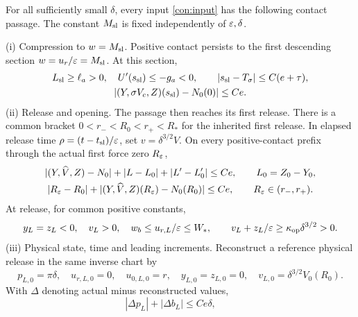 \begin{theorem}
\label{con:contact-release}
For all sufficiently small $\delta$, every input \eqref{con:input}
has the following contact passage. The constant $M_{\rm sl}$ is fixed
independently of $\varepsilon,\delta$.

\smallskip\noindent
\textup{(i) Compression to $w=M_{\rm sl}$.}
Positive contact persists to the first descending section
$w=u_r/\varepsilon=M_{\rm sl}$. At this section,
\begin{equation}
 \begin{gathered}
 L_{\rm sl}\ge\ell_a>0,\quad U'(s_{\rm sl})\le-g_a<0,\qquad
 |s_{\rm sl}-T_\sigma|\le C(e+\tau),\\
 |(Y,\sigma V_c,Z)(s_{\rm sl})-N_0(0)|\le Ce.
 \end{gathered}
 \label{con:M-admission}
\end{equation}
\smallskip\noindent
\textup{(ii) Release and opening.}
The passage then reaches its first release.
There is a common bracket $0<r_-<R_0<r_+<R_*$ for the inherited first
release.  In elapsed release time $\rho=(t-t_{\rm sl})/\varepsilon$, set
$v=\delta^{3/2}\widehat V$.  On every positive-contact prefix through
the actual first force zero $R_\varepsilon$,
\begin{equation}
 \begin{gathered}
 |(Y,\widehat V,Z)-N_0|+|L-L_0|+|L'-L_0'|\le Ce,
 \qquad L_0=Z_0-Y_0,\\
 |R_\varepsilon-R_0|+
 |(Y,\widehat V,Z)(R_\varepsilon)-N_0(R_0)|\le Ce,
 \qquad R_\varepsilon\in(r_-,r_+).
 \end{gathered}
 \label{con:release-comparison}
\end{equation}
At release, for common positive constants,
\begin{equation}
 y_L=z_L<0,\quad v_L>0,\quad
 w_b\le u_{r,L}/\varepsilon\le W_*,\qquad
 v_L+z_L/\varepsilon\ge \kappa_{\rm op}\delta^{3/2}>0.
 \label{con:opening}
\end{equation}
\reservestatementspace
\smallskip\noindent
\textup{(iii) Physical state, time and leading increments.}
Reconstruct a reference physical release in the same inverse chart by
\begin{equation}
 p_{L,0}=\pi\delta,\quad u_{r,L,0}=0,\quad u_{0,L,0}=r,
 \quad y_{L,0}=z_{L,0}=0,\quad
 v_{L,0}=\delta^{3/2}V_0(R_0).
 \label{con:physical-reconstruction}
\end{equation}
With $\Delta$ denoting actual minus reconstructed values,
\begin{equation}
 |\Delta p_L|+|\Delta b_L|\le Ce\delta,\qquad

\end{equation}
\end{theorem}
